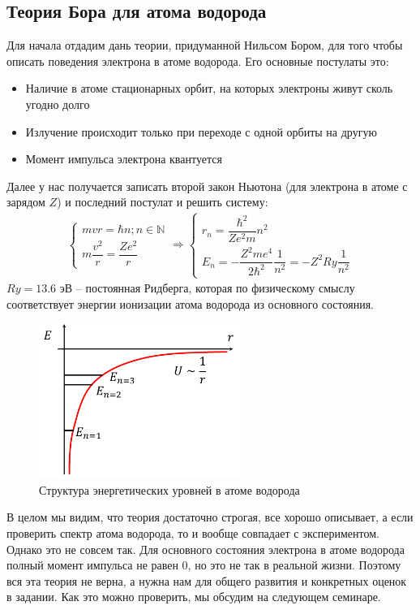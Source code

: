 \documentclass[12pt]{article}
\begin{document}
\subsection{Теория Бора для атома водорода}
Для начала отдадим дань теории, придуманной Нильсом Бором, для того чтобы описать поведения электрона в атоме водорода. Его основные постулаты это:
\begin{itemize}
    \item Наличие в атоме стационарных орбит, на которых электроны живут сколь угодно долго
    \item Излучение происходит только при переходе с одной орбиты на другую
    \item Момент импульса электрона квантуется
\end{itemize}
Далее у нас получается записать второй закон Ньютона (для электрона в атоме с зарядом $Z$) и последний постулат и решить систему:
\begin{gather*}
    \begin{cases}
     mvr = \hbar n; n\in \mathbb{N}\\[10pt]
     m\dfrac{v^2}{r} = \dfrac{Ze^2}{r}
     \end{cases}
     \Rightarrow
     \begin{cases}
     r_n = \dfrac{\hbar^2}{Ze^2m}n^2\\[10pt]
     E_n = -\dfrac{Z^2me^4}{2\hbar^2} \dfrac{1}{n^2} = -Z^2 Ry\dfrac{1}{n^2}
     \end{cases}
\end{gather*}
$Ry = 13.6$ эВ -- постоянная Ридберга, которая по физическому смыслу соответствует энергии ионизации атома водорода из основного состояния. \\
\begin{figure}[h]
    \centering
    \includegraphics[width=0.6\textwidth,height=\textheight,keepaspectratio]{Seminar_06/pics/pic_02.pdf}
    \caption{Структура энергетических уровней в атоме водорода}
    \label{fig:sem_04_H_energy_levels}
\end{figure}
В целом мы видим, что теория достаточно строгая, все хорошо описывает, а если проверить спектр атома водорода, то и вообще совпадает с экспериментом. Однако это не совсем так. Для основного состояния электрона в атоме водорода полный момент импульса не равен 0, но это не так в реальной жизни. Поэтому вся эта теория не верна, а нужна нам для общего развития и конкретных оценок в задании. Как это можно проверить, мы обсудим на следующем семинаре. 
\end{document}
